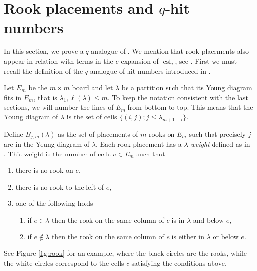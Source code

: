 \documentclass[10pt]{amsart}
\theoremstyle{definition}
\DeclareMathOperator{\csf}{csf}
\begin{document}
\section{Rook placements and $q$-hit numbers}
  In this section, we prove a $q$-analogue of \cite[Theorem 4.3]{StanStem}. We mention that rook placements also appear in relation with terms in the $e$-expansion of $\csf_q$, see \cite{AlexPanova}.  First we must recall the definition of the $q$-analogue of hit numbers introduced in \cite{GarsiaRemmel}.\par
Let $E_m$ be the $m\times m$ board and let $\lambda$ be a partition such that its Young diagram fits in $E_m$, that is $\lambda_1,\ell(\lambda)\leq m$. To keep the notation consistent with the last sections, we will number the lines of $E_m$ from bottom to top. This means that the Young diagram of $\lambda$ is the set of cells $\{(i,j); j\leq \lambda_{m+1-i}\}$.\par
Define $B_{j,m}(\lambda)$ as the set of placements of $m$ rooks on $E_m$ such that precisely $j$ are in the Young diagram of $\lambda$. Each rook placement has a \emph{$\lambda$-weight} defined as in \cite{Dworkin}. This weight is the number of cells $e\in E_m$ such that
\begin{enumerate}
    \item there is no rook on $e$,
    \item there is no rook to the left of $e$,
    \item one of the following holds
    \begin{enumerate}
        \item if $e\in \lambda$ then the rook on the same column of $e$ is in $\lambda$ and below $e$,
        \item if $e\notin \lambda$ then the rook on the same column of $e$ is either in $\lambda$ or below $e$.
    \end{enumerate}
\end{enumerate} See Figure \ref{fig:rook} for an example, where the black circles are the rooks, while the white circles correspond to the cells $e$ satisfying the conditions above. %
\end{document}
